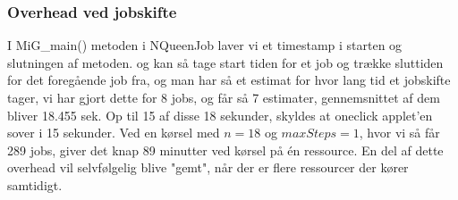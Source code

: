 \subsubsection{Overhead ved jobskifte}

I MiG\_main() metoden i NQueenJob laver vi et timestamp i starten og slutningen
af metoden.  og kan så tage start tiden for et job og trække sluttiden for det
foregående job fra, og man har så et estimat for hvor lang tid et jobskifte
tager, vi har gjort dette for 8 jobs, og får så 7 estimater, gennemsnittet af
dem bliver 18.455 sek.  Op til 15 af disse 18 sekunder, skyldes at oneclick
applet'en sover i 15 sekunder.  Ved en kørsel med $n=18$ og $maxSteps=1$, hvor
vi så får 289 jobs, giver det knap 89 minutter ved kørsel på én ressource. En del af dette overhead vil
selvfølgelig blive "gemt", når der er flere ressourcer der kører samtidigt.


